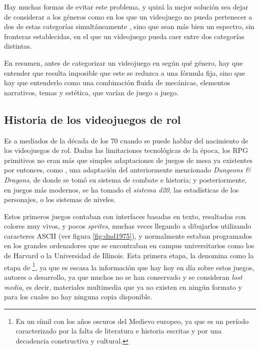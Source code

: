 \medskip

Hay muchas formas de evitar este problema, y quizá la mejor solución sea dejar de considerar a los géneros como  en los que un videojuego no pueda pertenecer a dos de estas categorías simultáneamente \citep{Apperley}, sino que sean más bien un espectro, sin fronteras establecidas, en el que un videojuego pueda caer entre dos categorías distintas.

\smallskip

En resumen, antes de categorizar un videojuego en según qué género, hay que entender que resulta imposible que este se reduzca a una fórmula fija, sino que hay que entenderlo como una combinación fluida de mecánicas, elementos narrativos, temas y estética, que varían de juego a juego.

\subsection{Historia de los videojuegos de rol}


Es a mediados de la década de los 70 cuando se puede hablar del nacimiento de los videojuegos de rol. Dadas las limitaciones tecnológicas de la época, los RPG primitivos no eran más que simples adaptaciones de juegos de mesa ya existentes por entonces, como , una adaptación del anteriormente mencionado \textit{Dungeons \& Dragons}, de donde se tomó su sistema de combate e historia; y posteriormente, en juegos más modernos, se ha tomado el \textit{sistema d20}, las estadísticas de los personajes, o los sistemas de niveles. 

\smallskip

Estos primeros juegos contaban con interfaces basadas en texto, resaltadas con colores muy vivos, y pocos \textit{sprites}, muchas veces llegando a dibujarlos utilizando caracteres ASCII (ver figura \ref{fig:dnd1975}), y normalmente estaban programados en los grandes ordenadores que se encontraban en campus universitarios como los de Harvard o la Universidad de Illinois. Esta primera etapa, \cite{barton2008dungeons} la denomina como la etapa de \footnote{En un símil con los años oscuros del Medievo europeo, ya que es un período caracterizado por la falta de literatura e historia escritas y por una decadencia constructiva y cultural.}, ya que es escasa la información que hay hoy en día sobre estos juegos, autores o desarrollo, ya que muchos no se han conservado y se consideran \textit{lost media}, es decir, materiales multimedia que ya no existen en ningún formato y para los cuales no hay ninguna copia disponible.

